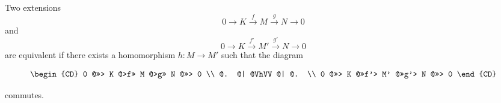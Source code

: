Two extensions
$$0 \rightarrow K \xrightarrow{f} M \xrightarrow{g} N \rightarrow 0$$
and
$$0 \rightarrow K \xrightarrow{f'} M' \xrightarrow{g'} N \rightarrow 0$$
are equivalent if there exists a homomorphism $h: M \rightarrow M'$ such that the diagram

\[
\begin{CD}
0 @>>> K @>f>> M @>g>> N @>>> 0 \\
@. @| @VhVV @| @. \\
0 @>>> K @>>f'> M' @>>g'> N @>>> 0
\end{CD}
\]

commutes.
